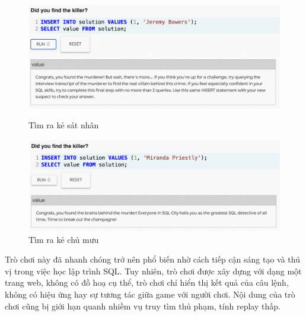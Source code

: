 \begin{figure}[H]
	\centering
	\begin{minipage}{.5\textwidth}
		\centering
		\includegraphics[width=0.75\linewidth]{Images/smm_killer.png}
		\vspace{0.5cm}
		\caption{Tìm ra kẻ sát nhân}
		\label{fig:test1}
	\end{minipage}%
	\begin{minipage}{.5\textwidth}
		\centering
		\includegraphics[width=.75\linewidth]{Images/smm_boss.png}
		\vspace{0.5cm}
		\caption{Tìm ra kẻ chủ mưu}
		\label{fig:test2}
	\end{minipage}
\end{figure}
\hspace*{0.5cm} Trò chơi này đã nhanh chóng trở nên phổ biến nhờ cách tiếp cận sáng tạo và thú vị trong việc học lập trình SQL. Tuy nhiên, trò chơi được xây dựng với dạng một trang web, không có đồ hoạ cụ thể, trò chơi chỉ hiển thị kết quả của câu lệnh, không có hiệu ứng hay sự tương tác giữa game với người chơi. Nội dung của trò chơi cũng bị giới hạn quanh nhiềm vụ truy tìm thủ phạm, tính replay thấp.

